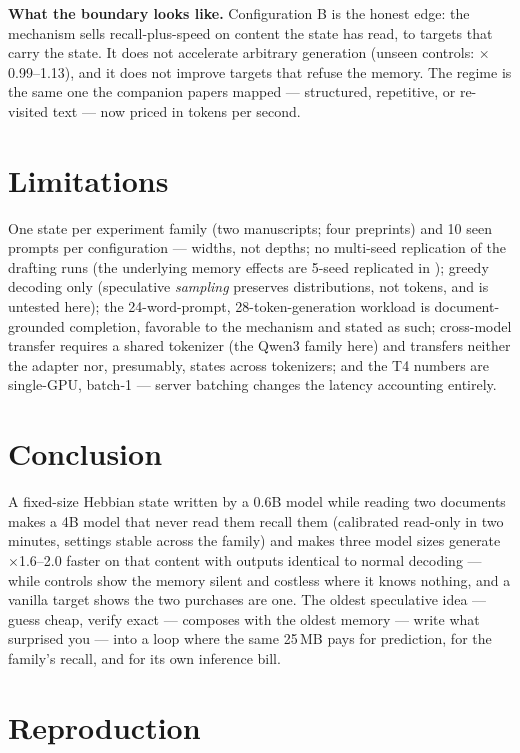 \documentclass[11pt]{article}
\begin{document}
\textbf{What the boundary looks like.} Configuration B is the honest edge: the mechanism sells recall-plus-speed on content the state has read, to targets that carry the state. It does not accelerate arbitrary generation (unseen controls: $\times$0.99--1.13), and it does not improve targets that refuse the memory. The regime is the same one the companion papers mapped --- structured, repetitive, or re-visited text --- now priced in tokens per second.

\section{Limitations}

One state per experiment family (two manuscripts; four preprints) and 10 seen prompts per configuration --- widths, not depths; no multi-seed replication of the drafting runs (the underlying memory effects are 5-seed replicated in \cite{sillage,router}); greedy decoding only (speculative \emph{sampling} \cite{leviathan,chen} preserves distributions, not tokens, and is untested here); the 24-word-prompt, 28-token-generation workload is document-grounded completion, favorable to the mechanism and stated as such; cross-model transfer requires a shared tokenizer (the Qwen3 family here) and transfers neither the adapter nor, presumably, states across tokenizers; and the T4 numbers are single-GPU, batch-1 --- server batching changes the latency accounting entirely.

\section{Conclusion}

A fixed-size Hebbian state written by a 0.6B model while reading two documents makes a 4B model that never read them recall them (calibrated read-only in two minutes, settings stable across the family) and makes three model sizes generate $\times$1.6--2.0 faster on that content with outputs identical to normal decoding --- while controls show the memory silent and costless where it knows nothing, and a vanilla target shows the two purchases are one. The oldest speculative idea --- guess cheap, verify exact --- composes with the oldest memory --- write what surprised you --- into a loop where the same 25\,MB pays for prediction, for the family's recall, and for its own inference bill.

\appendix

\section{Reproduction}
\end{document}
